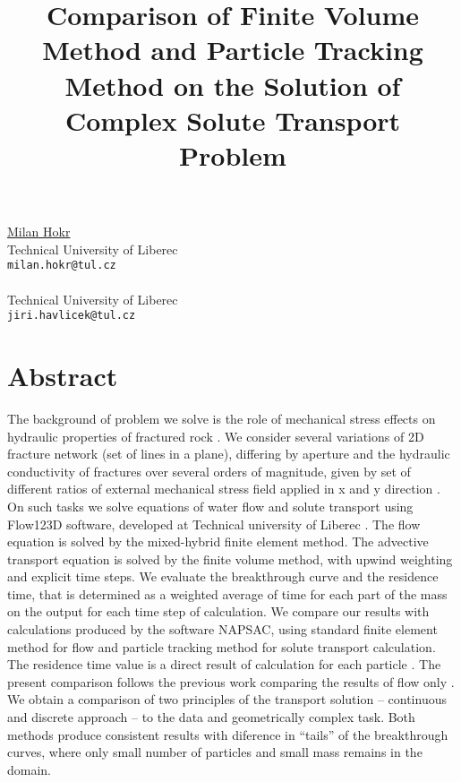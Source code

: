 \title{Comparison of Finite Volume Method and Particle Tracking Method on the Solution of Complex Solute Transport Problem}
 \author{} \institute{}
\maketitle
\begin{center}
{\large \underline{Milan Hokr}}\\
Technical University of Liberec\\
{\tt milan.hokr@tul.cz}
\\ \vspace{4mm}{\large Jiri Havlicek}\\
Technical University of Liberec\\
{\tt jiri.havlicek@tul.cz}

\end{center}

\section*{Abstract}

The background of problem we solve is the role of mechanical stress effects on hydraulic properties
of fractured rock \cite{bag}. We consider several variations of 2D fracture network (set of lines in a plane), differing
by aperture and the hydraulic conductivity of fractures over several orders of magnitude, given by set of
different ratios of external mechanical stress field applied in x and y direction \cite{hud}.
On such tasks we solve equations of water flow and solute transport using Flow123D software, developed at
Technical university of Liberec \cite{flow123}. The flow equation is solved by the mixed-hybrid finite element method.
The advective transport equation is solved by the finite volume method, with upwind weighting and
explicit time steps. We evaluate the breakthrough curve and the residence time, that is determined as a
weighted average of time for each part of the mass on the output for each time step of calculation.
We compare our results with calculations produced by the software NAPSAC, using standard finite
element method for flow and  particle tracking method for solute transport calculation. The
residence time value is a direct result of calculation for each particle \cite{pol}.
The present comparison follows the previous work comparing the results of flow only \cite{hokr}. We obtain
a comparison of two principles of the transport solution -- continuous and discrete approach -- to the data
and geometrically complex task. Both methods produce consistent results with diference in ``tails'' of
the breakthrough curves, where only small number of particles and small mass remains in the domain.

